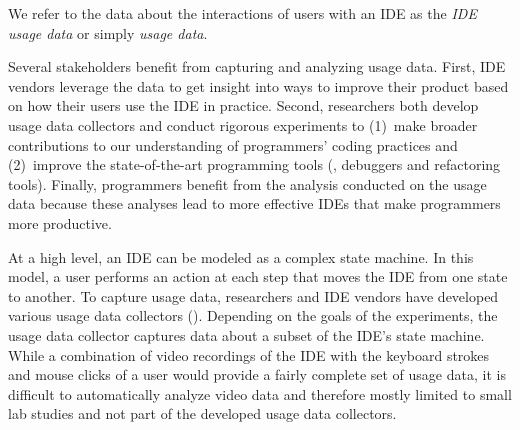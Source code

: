 We refer to the data about the interactions of users with an IDE as the
\emph{IDE usage data} or simply \emph{usage data}.

%
Several stakeholders benefit from capturing and analyzing usage data. First, IDE
vendors leverage the data to get insight into ways to improve their product
based on how their users use the IDE in practice. Second, researchers both
develop usage data collectors and conduct rigorous experiments to (1)~make
broader contributions to our understanding of programmers' coding practices and
(2)~improve the state-of-the-art programming tools (\eg, debuggers and
refactoring tools). Finally, programmers benefit from the analysis conducted on
the usage data because these analyses lead to more effective IDEs that make
programmers more productive.

At a high level, an IDE can be modeled as a complex state machine. In this
model, a user performs an action at each step that moves the IDE from one state
to another.
To capture usage data, researchers and IDE vendors have
developed various usage data collectors ().
Depending on the goals of the experiments, the usage data collector captures
data about a subset of the IDE's state machine. While a combination of video recordings of the IDE with the keyboard strokes and mouse clicks of a user would provide a fairly complete set of usage data, it is difficult to automatically analyze video data and therefore mostly limited to small lab studies and not part of the developed usage data collectors.



